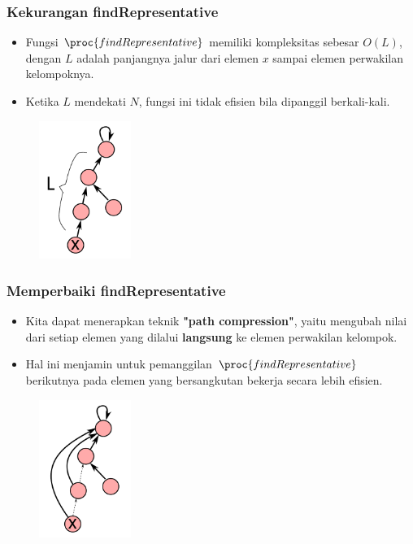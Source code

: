 \begin{frame}
\frametitle{Kekurangan findRepresentative}
\begin{itemize}
  \item Fungsi $\proc{findRepresentative}$ memiliki kompleksitas sebesar $O(L)$, dengan $L$ adalah panjangnya jalur dari elemen $x$ sampai elemen perwakilan kelompoknya.
  \item Ketika $L$ mendekati $N$, fungsi ini tidak efisien bila dipanggil berkali-kali.
\end{itemize}
\begin{figure}
  \includegraphics[width=3cm]{asset/chain-long.pdf}
\end{figure}
\end{frame}

\begin{frame}
\frametitle{Memperbaiki findRepresentative}
\begin{itemize}
  \item Kita dapat menerapkan teknik \textbf{"path compression"}, yaitu mengubah nilai  dari setiap elemen yang dilalui \textbf{langsung} ke elemen perwakilan kelompok.
  \item Hal ini menjamin untuk pemanggilan $\proc{findRepresentative}$ berikutnya pada elemen yang bersangkutan bekerja secara lebih efisien.
\end{itemize}
\begin{figure}
  \includegraphics[width=3cm]{asset/chain-compressed.pdf}
\end{figure}
\end{frame}

